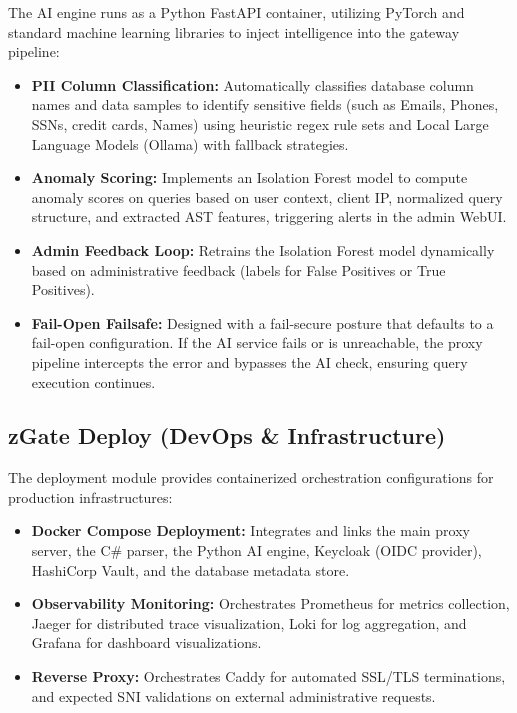 The AI engine runs as a Python FastAPI container, utilizing PyTorch and standard machine learning libraries to inject intelligence into the gateway pipeline:
\begin{itemize}
    \item \textbf{PII Column Classification:} Automatically classifies database column names and data samples to identify sensitive fields (such as Emails, Phones, SSNs, credit cards, Names) using heuristic regex rule sets and Local Large Language Models (Ollama) with fallback strategies.
    \item \textbf{Anomaly Scoring:} Implements an Isolation Forest model to compute anomaly scores on queries based on user context, client IP, normalized query structure, and extracted AST features, triggering alerts in the admin WebUI.
    \item \textbf{Admin Feedback Loop:} Retrains the Isolation Forest model dynamically based on administrative feedback (labels for False Positives or True Positives).
    \item \textbf{Fail-Open Failsafe:} Designed with a fail-secure posture that defaults to a fail-open configuration. If the AI service fails or is unreachable, the proxy pipeline intercepts the error and bypasses the AI check, ensuring query execution continues.
\end{itemize}


\subsection{zGate Deploy (DevOps \& Infrastructure)}

The deployment module provides containerized orchestration configurations for production infrastructures:
\begin{itemize}
    \item \textbf{Docker Compose Deployment:} Integrates and links the main proxy server, the C\# parser, the Python AI engine, Keycloak (OIDC provider), HashiCorp Vault, and the database metadata store.
    \item \textbf{Observability Monitoring:} Orchestrates Prometheus for metrics collection, Jaeger for distributed trace visualization, Loki for log aggregation, and Grafana for dashboard visualizations.
    \item \textbf{Reverse Proxy:} Orchestrates Caddy for automated SSL/TLS terminations, and expected SNI validations on external administrative requests.
\end{itemize}

